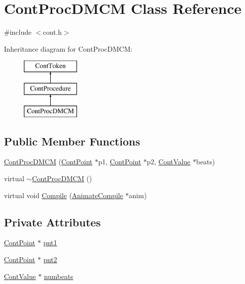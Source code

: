 \hypertarget{a00065}{\section{Cont\-Proc\-D\-M\-C\-M Class Reference}
\label{a00065}
}


{\ttfamily \#include $<$cont.\-h$>$}

Inheritance diagram for Cont\-Proc\-D\-M\-C\-M\-:\begin{figure}[H]
\begin{center}
\leavevmode
\includegraphics[height=3.000000cm]{a00065}
\end{center}
\end{figure}
\subsection*{Public Member Functions}
\begin{DoxyCompactItemize}
\item 
\hyperlink{a00065_acbc50672578ded6f655eb50a02208776}{Cont\-Proc\-D\-M\-C\-M} (\hyperlink{a00062}{Cont\-Point} $\ast$p1, \hyperlink{a00062}{Cont\-Point} $\ast$p2, \hyperlink{a00086}{Cont\-Value} $\ast$beats)
\item 
virtual \hyperlink{a00065_a6bfe1651fbaa9f23a5fd3f5330c2d364}{$\sim$\-Cont\-Proc\-D\-M\-C\-M} ()
\item 
virtual void \hyperlink{a00065_a90453323245d51cccd91dd50802e9f66}{Compile} (\hyperlink{a00007}{Animate\-Compile} $\ast$anim)
\end{DoxyCompactItemize}
\subsection*{Private Attributes}
\begin{DoxyCompactItemize}
\item 
\hyperlink{a00062}{Cont\-Point} $\ast$ \hyperlink{a00065_a52e7aee506251aa08d2c1460e56d0046}{pnt1}
\item 
\hyperlink{a00062}{Cont\-Point} $\ast$ \hyperlink{a00065_a6c0c5b4a783714400be626e0989a7ed9}{pnt2}
\item 
\hyperlink{a00086}{Cont\-Value} $\ast$ \hyperlink{a00065_aee975972e470093cdd88861077d4774a}{numbeats}
\end{DoxyCompactItemize}
